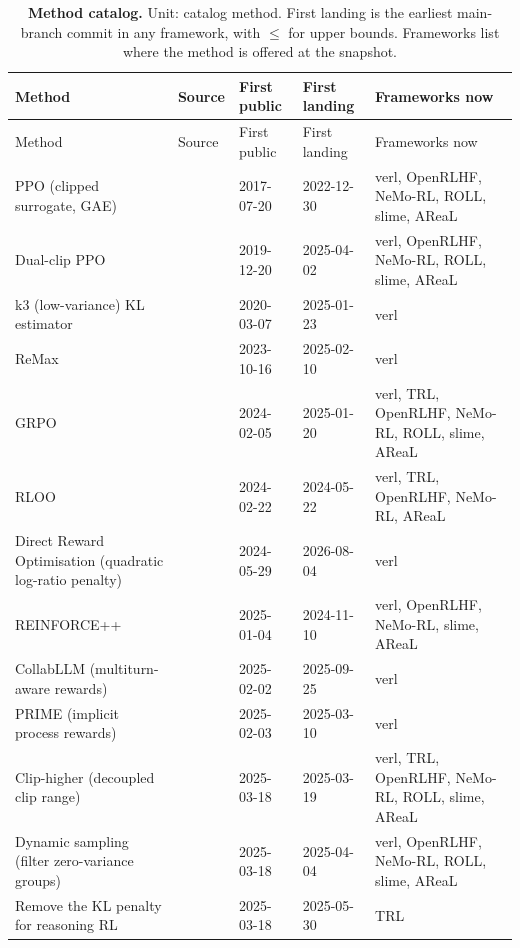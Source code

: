 \begin{longtable}{@{}>{\raggedright\arraybackslash}p{3.5cm} >{\raggedright\arraybackslash}p{2.3cm} l l >{\raggedright\arraybackslash}p{2.9cm}@{}}
\caption{\textbf{Method catalog.} Unit: catalog method. First landing is the earliest main-branch commit in any framework, with $\le$ for upper bounds. Frameworks list where the method is offered at the snapshot.}\label{tab:catalog} \\
\toprule
Method & Source & First public & First landing & Frameworks now \\
\midrule
\endfirsthead
\toprule
Method & Source & First public & First landing & Frameworks now \\
\midrule
\endhead
\bottomrule
\endfoot
PPO (clipped surrogate, GAE) & \citet{arxiv170706347} & 2017-07-20 & 2022-12-30 & verl, OpenRLHF, NeMo-RL, ROLL, slime, AReaL \\
Dual-clip PPO & \citet{arxiv191209729} & 2019-12-20 & 2025-04-02 & verl, OpenRLHF, NeMo-RL, ROLL, slime, AReaL \\
k3 (low-variance) KL estimator & \citet{schulman2020kl} & 2020-03-07 & 2025-01-23 & verl \\
ReMax & \citet{arxiv231010505} & 2023-10-16 & 2025-02-10 & verl \\
GRPO & \citet{arxiv240203300} & 2024-02-05 & 2025-01-20 & verl, TRL, OpenRLHF, NeMo-RL, ROLL, slime, AReaL \\
RLOO & \citet{arxiv240214740} & 2024-02-22 & 2024-05-22 & verl, TRL, OpenRLHF, NeMo-RL, AReaL \\
Direct Reward Optimisation (quadratic log-ratio penalty) & \citet{arxiv240519107} & 2024-05-29 & 2026-08-04 & verl \\
REINFORCE++ & \citet{arxiv250103262} & 2025-01-04 & 2024-11-10 & verl, OpenRLHF, NeMo-RL, slime, AReaL \\
CollabLLM (multiturn-aware rewards) & \citet{arxiv250200640} & 2025-02-02 & 2025-09-25 & verl \\
PRIME (implicit process rewards) & \citet{arxiv250201456} & 2025-02-03 & 2025-03-10 & verl \\
Clip-higher (decoupled clip range) & \citet{arxiv250314476} & 2025-03-18 & 2025-03-19 & verl, TRL, OpenRLHF, NeMo-RL, ROLL, slime, AReaL \\
Dynamic sampling (filter zero-variance groups) & \citet{arxiv250314476} & 2025-03-18 & 2025-04-04 & verl, OpenRLHF, NeMo-RL, ROLL, slime, AReaL \\
Remove the KL penalty for reasoning RL & \citet{arxiv250314476} & 2025-03-18 & 2025-05-30 & TRL \\

\end{longtable}
